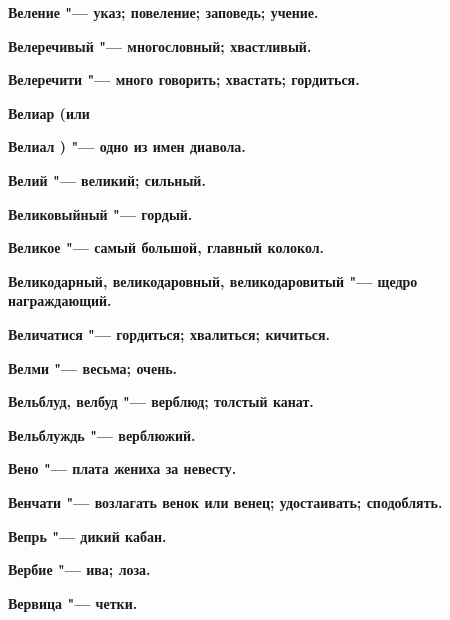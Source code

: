 \bfseries Веление \normalfont{} "--- указ; повеление; заповедь; учение. 




\bfseries Велеречивый \normalfont{} "--- многословный; хвастливый. 




\bfseries Велеречити \normalfont{} "--- много говорить; хвастать; гордиться. 




\bfseries Велиар \normalfont{} (или 




\bfseries Велиал \normalfont{}) "--- одно из имен диавола. 




\bfseries Велий \normalfont{} "--- великий; сильный. 




\bfseries Великовыйный \normalfont{} "--- гордый. 




\bfseries Великое \normalfont{} "--- самый большой, главный колокол. 




\bfseries Великодарный, великодаровный, великодаровитый \normalfont{} "--- щедро награждающий. 




\bfseries Величатися \normalfont{} "--- гордиться; хвалиться; кичиться. 




\bfseries Велми \normalfont{} "--- весьма; очень. 




\bfseries Вельблуд, велбуд \normalfont{} "--- верблюд; толстый канат. 




\bfseries Вельблуждь \normalfont{} "--- верблюжий. 




\bfseries Вено \normalfont{} "--- плата жениха за невесту. 




\bfseries Венчати \normalfont{} "--- возлагать венок или венец; удостаивать; сподоблять. 




\bfseries Вепрь \normalfont{} "--- дикий кабан. 




\bfseries Вербие \normalfont{} "--- ива; лоза. 




\bfseries Вервица \normalfont{} "--- четки. 




